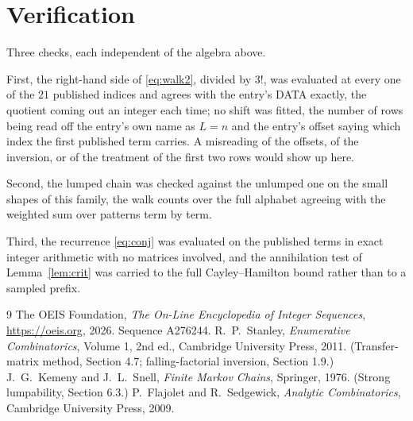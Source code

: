 \documentclass[11pt,a4paper]{article}
\theoremstyle{plain}
\theoremstyle{definition}
\begin{document}
\section{Verification}

Three checks, each independent of the algebra above.

First, the right-hand side of \eqref{eq:walk2}, divided by $3!$, was evaluated at every
one of the $21$ published indices and agrees with the entry's DATA exactly, the quotient
coming out an integer each time; no shift was fitted, the number of rows being read off the
entry's own name as $L=n$ and the entry's offset saying which index the first published
term carries. A misreading of the offsets, of the inversion, or of the treatment of the first
two rows would show up here.

Second, the lumped chain was checked against the unlumped one on the small shapes of this
family, the walk counts over the full alphabet agreeing with the weighted sum over patterns
term by term.

Third, the recurrence \eqref{eq:conj} was evaluated on the published terms in exact integer
arithmetic with no matrices involved, and the annihilation test of Lemma~\ref{lem:crit} was
carried to the full Cayley--Hamilton bound rather than to a sampled prefix.

\begin{thebibliography}{9}
 The OEIS Foundation, \emph{The On-Line Encyclopedia of Integer
Sequences}, \url{https://oeis.org}, 2026. Sequence A276244.
 R.~P.~Stanley, \emph{Enumerative Combinatorics}, Volume 1, 2nd ed.,
Cambridge University Press, 2011. (Transfer-matrix method, Section 4.7; falling-factorial
inversion, Section 1.9.)
 J.~G.~Kemeny and J.~L.~Snell, \emph{Finite Markov Chains}, Springer,
1976. (Strong lumpability, Section 6.3.)
 P.~Flajolet and R.~Sedgewick, \emph{Analytic Combinatorics}, Cambridge
University Press, 2009.
\end{thebibliography}
\end{document}
